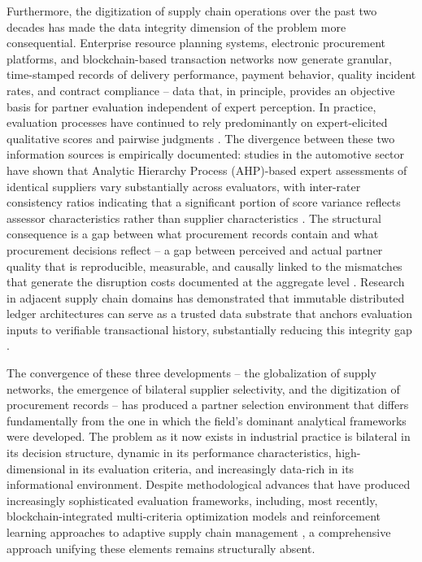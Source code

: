 \documentclass[11pt]{article}
\begin{document}
Furthermore, the digitization of supply chain operations over the past two decades has made the data integrity dimension of the problem more consequential. Enterprise resource planning systems, electronic procurement platforms, and blockchain-based transaction networks now generate granular, time-stamped records of delivery performance, payment behavior, quality incident rates, and contract compliance -- data that, in principle, provides an objective basis for partner evaluation independent of expert perception. In practice, evaluation processes have continued to rely predominantly on expert-elicited qualitative scores and pairwise judgments \cite{ref10}. The divergence between these two information sources is empirically documented: studies in the automotive sector have shown that Analytic Hierarchy Process (AHP)-based expert assessments of identical suppliers vary substantially across evaluators, with inter-rater consistency ratios indicating that a significant portion of score variance reflects assessor characteristics rather than supplier characteristics \cite{ref13}. The structural consequence is a gap between what procurement records contain and what procurement decisions reflect -- a gap between perceived and actual partner quality that is reproducible, measurable, and causally linked to the mismatches that generate the disruption costs documented at the aggregate level \cite{ref1,ref2}. Research in adjacent supply chain domains has demonstrated that immutable distributed ledger architectures can serve as a trusted data substrate that anchors evaluation inputs to verifiable transactional history, substantially reducing this integrity gap \cite{ref19}.

The convergence of these three developments -- the globalization of supply networks, the emergence of bilateral supplier selectivity, and the digitization of procurement records -- has produced a partner selection environment that differs fundamentally from the one in which the field's dominant analytical frameworks were developed. The problem as it now exists in industrial practice is bilateral in its decision structure, dynamic in its performance characteristics, high-dimensional in its evaluation criteria, and increasingly data-rich in its informational environment. Despite methodological advances that have produced increasingly sophisticated evaluation frameworks, including, most recently, blockchain-integrated multi-criteria optimization models \cite{ref19} and reinforcement learning approaches to adaptive supply chain management \cite{ref18}, a comprehensive approach unifying these elements remains structurally absent.
\end{document}
